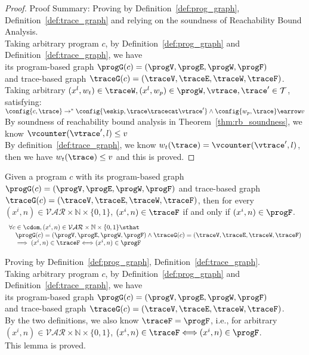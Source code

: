\begin{proof}
Proof Summary: Proving by Definition~\ref{def:prog_graph}, Definition~\ref{def:trace_graph} and relying on the soundness of Reachability Bound 
Analysis.
\\
Taking arbitrary program $c$,
by Definition~\ref{def:prog_graph} and Definition~\ref{def:trace_graph}, 
we have   
\\
its program-based graph $\progG({c}) = (\progV, \progE, \progW, \progF)$ 
\\
and 
trace-based graph $\traceG({c}) = (\traceV, \traceE, \traceW, \traceF)$.
\\
Taking arbitrary 
$(x^l, w_{t}) \in \traceW, (x^l, w_{p}) \in \progW, \vtrace, \trace' \in \mathcal{T}$, satisfying:
\\
$\config{{c}, \trace} \to^{*} \config{\eskip, \trace\tracecat\vtrace'} 
\land 
\config{w_{p}, \trace} \earrow v$
\\
By soundness of reachability bound analysis in Theorem~\ref{thm:rb_soundness}, we know 
$\vcounter(\vtrace', l) \leq v$
\\
By definition~\ref{def:trace_graph}, we know $w_t(\trace) = \vcounter(\vtrace', l)$,
then we have $w_t(\trace) \leq v$ and this is proved.
\end{proof}
%
\begin{lem}
	\label{lem:queryvertex_map}
	Given a program $c$ with its
	program-based graph $\progG({c}) = (\progV, \progE, \progW, \progF)$
	and 
	trace-based graph $\traceG({c}) = (\traceV, \traceE, \traceW, \traceF)$,
	then for every $(x^i, n) \in \mathcal{VAR} \times \mathbb{N}  \times \{0, 1\} $,
	 $(x^i, n) \in \traceF$ if and only if $ (x^i, n) \in \progF$.
	\[
	\begin{array}{l}
	\forall c \in \cdom , (x^i, n) \in \mathcal{VAR} \times \mathbb{N}  \times \{0, 1\} 
	 \sthat  
	 \\ \quad
	 \progG({c}) = (\progV, \progE, \progW, \progF)
	\land 
	\traceG({c}) = (\traceV, \traceE, \traceW, \traceF)
	\\ \quad
	\implies
	(x^i, n) \in \traceF \Longleftrightarrow  (x^i, n) \in \progF
	\end{array}
	\]
	\end{lem}
\begin{subproof}
Proving by Definition~\ref{def:prog_graph}, Definition~\ref{def:trace_graph}.
\\
Taking arbitrary program $c$,
by Definition~\ref{def:prog_graph} and Definition~\ref{def:trace_graph}, 
we have   
\\
its program-based graph $\progG({c}) = (\progV, \progE, \progW, \progF)$ 
\\
and 
trace-based graph $\traceG({c}) = (\traceV, \traceE, \traceW, \traceF)$.
\\
By the two definitions, we also know $\traceF  = \progF$, 
i.e., 
for arbitrary $ (x^i, n) \in \mathcal{VAR} \times \mathbb{N}  \times \{0, 1\} $,
 $(x^i, n) \in \traceF \Longleftrightarrow  (x^i, n) \in \progF$.
 \\
 This lemma is proved.
\end{subproof}